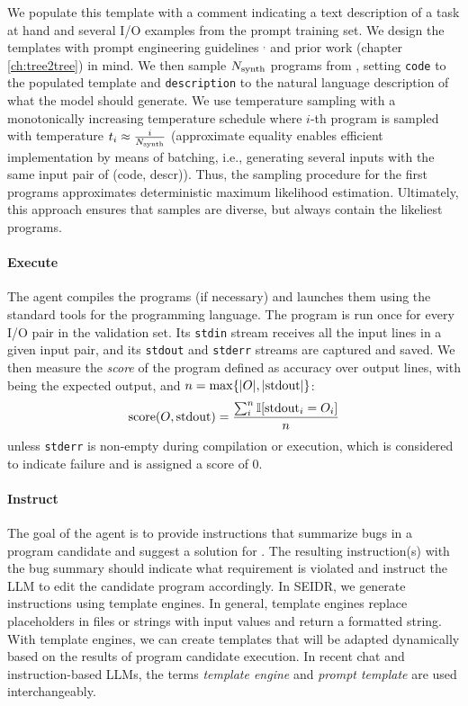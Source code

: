 We populate this template with a comment indicating a text description of a task at hand and several I/O examples from the prompt training set.
We design the templates with prompt engineering guidelines \cite{PromptEngineering}$^{,}$ and prior work (chapter \ref{ch:tree2tree}) in mind.
We then sample $N_\text{synth}{}$ programs from \synthmodel{}, setting \texttt{code} to the populated template and \texttt{description} to the natural language description of what the model should generate.
We use temperature sampling with a monotonically increasing temperature schedule where $i$-th program is sampled with temperature $t_i \approx \frac{i}{N_\text{synth}{}}$ (approximate equality enables efficient implementation by means of batching, i.e., generating several inputs with the same input pair of (code, descr)).
Thus, the sampling procedure for the first programs approximates deterministic maximum likelihood estimation.
Ultimately, this approach ensures that samples are diverse, but always contain the likeliest programs.

\paragraph{Execute}
\label{sec:seidr-execute}

The \execute{} agent compiles the programs (if necessary) and launches them using the standard tools for the programming language.
The program is run once for every I/O pair in the validation set. 
Its \texttt{stdin} stream receives all the input lines in a given input pair, and its \texttt{stdout} and \texttt{stderr} streams are captured and saved.
We then measure the \emph{score} of the program defined as accuracy over output lines, with \expectedoutput{} being the expected output, and $n=\max\{|O{}|, |\text{stdout}|\}$:
\[    
\text{score}(O{}, \text{stdout}) = \frac{\sum^{n}_i{\mathbb{I}[\text{stdout}_i = O_i]}}{n} 
\]
unless \texttt{stderr} is non-empty during compilation or execution, which is considered to indicate failure and is assigned a score of 0.

\paragraph{Instruct}
\label{sec:seidr-instruct}

The goal of the \instruct{} agent is to provide instructions that summarize bugs in a program candidate and suggest a solution for \debugmodel{}. 
The resulting instruction(s) with the bug summary should indicate what requirement is violated and instruct the LLM to edit the candidate program accordingly. 
In SEIDR, we generate instructions using template engines. 
In general, template engines replace placeholders in files or strings with input values and return a formatted string. 
With template engines, we can create templates that will be adapted dynamically based on the results of program candidate execution. 
In recent chat and instruction-based LLMs, the terms \emph{template engine} and \emph{prompt template} are used interchangeably.

